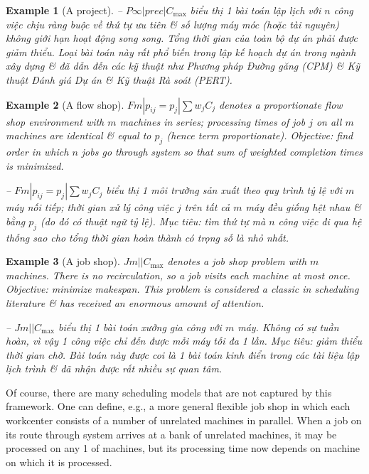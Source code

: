 \documentclass{article}
\newtheorem{example}{Example}
\begin{document}
\begin{itemize}
\begin{itemize}
\begin{example}[A project]
            -- $P\infty|prec|C_{\max}$ biểu thị 1 bài toán lập lịch với $n$ công việc chịu ràng buộc về thứ tự ưu tiên \& số lượng máy móc (hoặc tài nguyên) không giới hạn hoạt động song song. Tổng thời gian của toàn bộ dự án phải được giảm thiểu. Loại bài toán này rất phổ biến trong lập kế hoạch dự án trong ngành xây dựng \& đã dẫn đến các kỹ thuật như Phương pháp Đường găng (CPM) \& Kỹ thuật Đánh giá Dự án \& Kỹ thuật Rà soát (PERT).
        \end{example}

        \begin{example}[A flow shop]
            $Fm|p_{ij} = p_j|\sum w_jC_j$ denotes a proportionate flow shop environment with $m$ machines in series; processing times of job $j$ on all $m$ machines are identical \& equal to $p_j$ (hence term proportionate). Objective: find order in which $n$ jobs go through system so that sum of weighted completion times is minimized.

            -- $Fm|p_{ij} = p_j|\sum w_jC_j$ biểu thị 1 môi trường sản xuất theo quy trình tỷ lệ với $m$ máy nối tiếp; thời gian xử lý công việc $j$ trên tất cả $m$ máy đều giống hệt nhau \& bằng $p_j$ (do đó có thuật ngữ tỷ lệ). Mục tiêu: tìm thứ tự mà $n$ công việc đi qua hệ thống sao cho tổng thời gian hoàn thành có trọng số là nhỏ nhất.
        \end{example}

        \begin{example}[A job shop]
            $Jm||C_{\max}$ denotes a job shop problem with $m$ machines. There is no recirculation, so a job visits each machine at most once. Objective: minimize makespan. This problem is considered a classic in scheduling literature \& has received an enormous amount of attention.

            -- $Jm||C_{\max}$ biểu thị 1 bài toán xưởng gia công với $m$ máy. Không có sự tuần hoàn, vì vậy 1 công việc chỉ đến được mỗi máy tối đa 1 lần. Mục tiêu: giảm thiểu thời gian chờ. Bài toán này được coi là 1 bài toán kinh điển trong các tài liệu lập lịch trình \& đã nhận được rất nhiều sự quan tâm.
        \end{example}
        Of course, there are many scheduling models that are not captured by this framework. One can define, e.g., a more general flexible job shop in which each workcenter consists of a number of unrelated machines in parallel. When a job on its route through system arrives at a bank of unrelated machines, it may be processed on any 1 of machines, but its processing time now depends on machine on which it is processed.


\end{itemize}
\end{itemize}
\end{document}
